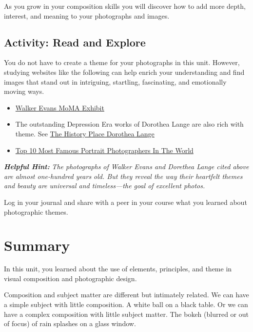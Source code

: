 \documentclass[
]{book}
\providecommand{\tightlist}{%
  \setlength{\itemsep}{0pt}\setlength{\parskip}{0pt}}
\begin{document}
As you grow in your composition skills you will discover how to add more depth, interest, and meaning to your photographs and images.

\hypertarget{activity-read-and-explore}{%
\subsection*{Activity: Read and Explore}\label{activity-read-and-explore}}

\begin{reflect}
You do not have to create a theme for your photographs in this unit. However, studying websites like the following can help enrich your understanding and find images that stand out in intriguing, startling, fascinating, and emotionally moving ways.

\begin{itemize}
\tightlist
\item
  \href{https://www.moma.org/artists/1777}{Walker Evans MoMA Exhibit}
\item
  The outstanding Depression Era works of Dorothea Lange are also rich with theme. See \href{http://www.historyplace.com/unitedstates/lange/}{The History Place Dorothea Lange}
\item
  \href{https://www.boredpanda.com/top-10-photographers-for-travel-portraits/?utm_source=google\&utm_medium=organic\&utm_campaign=organic}{Top 10 Most Famous Portrait Photographers In The World}
\end{itemize}

\textbf{\emph{Helpful Hint:}} \emph{The photographs of Walker Evans and Dorethea Lange cited above are almost one-hundred years old. But they reveal the way their heartfelt themes and beauty are universal and timeless---the goal of excellent photos.}

Log in your journal and share with a peer in your course what you learned about photographic themes.
\end{reflect}

\hypertarget{summary-2}{%
\section*{Summary}\label{summary-2}}

In this unit, you learned about the use of elements, principles, and theme in visual composition and photographic design.

Composition and subject matter are different but intimately related. We can have a simple subject with little composition. A white ball on a black table. Or we can have a complex composition with little subject matter. The bokeh (blurred or out of focus) of rain splashes on a glass window.
\end{document}
